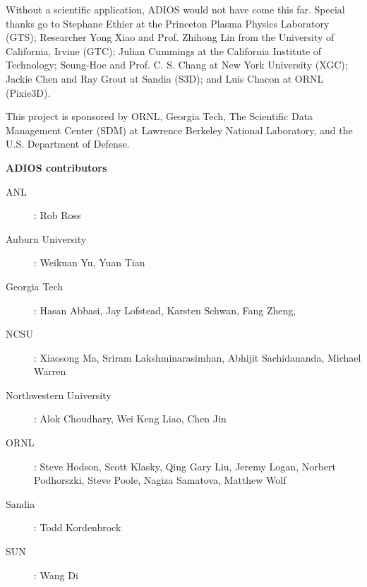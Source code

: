 \vspace{6pt}
Without a scientific application, ADIOS would not have come this far. Special thanks 
go to Stephane Ethier at the Princeton Plasma Physics Laboratory (GTS); Researcher 
Yong Xiao and Prof. Zhihong Lin from the University of California, Irvine (GTC); 
Julian Cummings at the California Institute of Technology; Seung-Hoe and Prof. 
C. S. Chang at New York University (XGC); Jackie Chen and Ray Grout at Sandia (S3D); 
and Luis Chacon at ORNL (Pixie3D). 

\vspace{6pt}
This project is sponsored by ORNL, Georgia Tech, The Scientific Data Management 
Center (SDM) at Lawrence Berkeley National Laboratory, and the U.S. Department 
of Defense. 

\pagebreak
{\Large \textbf{ADIOS contributors}}

\vspace{6pt}
\begin{description}
\item[ANL]: Rob Ross
\item[Auburn University]: Weikuan Yu, Yuan Tian
\item[Georgia Tech]: Hasan Abbasi, Jay Lofstead, Karsten Schwan, Fang Zheng,
\item[NCSU]: Xiaosong Ma, Sriram Lakshminarasimhan, Abhijit Sachidananda, Michael Warren 
\item[Northwestern University]: Alok Choudhary, Wei Keng Liao, Chen Jin
\item[ORNL]: Steve Hodson, Scott Klasky, Qing Gary Liu, Jeremy Logan,
Norbert Podhorszki, Steve Poole, Nagiza Samatova, Matthew Wolf
\item[Sandia]: Todd Kordenbrock
\item[SUN]: Wang Di
\end{description}


